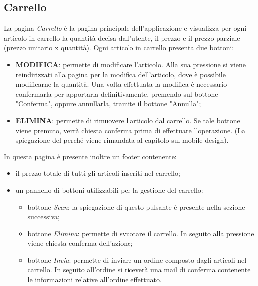 \documentclass[12pt, a4paper, titlepage]{report}
\begin{document}
	\subsection{Carrello}
	La pagina \textit{Carrello} è la pagina principale dell'applicazione e visualizza per ogni articolo in carrello la quantità decisa dall'utente, il prezzo e il prezzo parziale (prezzo unitario x quantità). Ogni articolo in carrello presenta due bottoni: 
	\begin{itemize}
		\item \textbf{MODIFICA}: permette di modificare l'articolo. Alla sua pressione si viene reindirizzati alla pagina per la modifica dell'articolo, dove è possibile modificarne la quantità. Una volta effettuata la modifica è necessario confermarla per apportarla definitivamente, premendo sul bottone "Conferma", oppure annullarla, tramite il bottone "Annulla";
		\item \textbf{ELIMINA}: permette di rimuovere l'articolo dal carrello. Se tale bottone viene premuto, verrà chiesta conferma prima di effettuare l'operazione. (La spiegazione del perché viene rimandata al capitolo sul mobile design).
	\end{itemize}
	In questa pagina è presente inoltre un footer contenente:
	\begin{itemize}
		\item il prezzo totale di tutti gli articoli inseriti nel carrello;
		\item un pannello di bottoni utilizzabili per la gestione del carrello:
		\begin{itemize}
			\item bottone \textit{Scan}: la spiegazione di questo pulsante è presente nella sezione successiva;
			\item bottone \textit{Elimina}: permette di svuotare il carrello. In seguito alla pressione viene chiesta conferma dell'azione;
			\item bottone \textit{Invia}: permette di inviare un ordine composto dagli articoli nel carrello. In seguito all'ordine si riceverà una mail di conferma contenente le informazioni relative all'ordine effettuato.
		\end{itemize}
	\end{itemize} 
	
\end{document}
